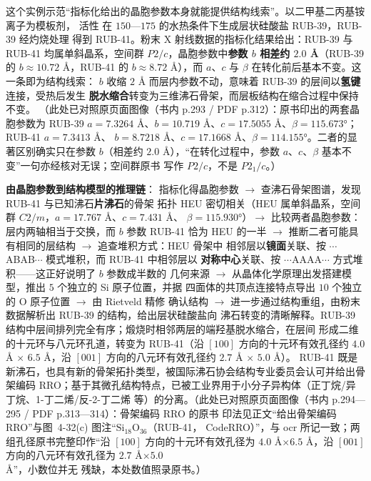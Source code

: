 \begin{principle}
这个实例示范``指标化给出的晶胞参数本身就能提供结构线索''。以二甲基二丙基铵离子为模板剂，
活性  在 $150$—$175$ \degC{} 的水热条件下生成层状硅酸盐 RUB-39，RUB-39 经灼烧处理
得到 RUB-41。粉末 X 射线数据的指标化结果给出：RUB-39 与 RUB-41 均属单斜晶系，空间群
$P2/c$，晶胞参数中\textbf{参数 $b$ 相差约 $2.0$ Å}（RUB-39 的 $b\approx10.72$ Å，RUB-41 的
$b\approx8.72$ Å），而 $a$、$c$ 与 $\beta$ 在转化前后基本不变。这一条即为结构线索：
$b$ 收缩 $2$ Å 而层内参数不动，意味着 RUB-39 的层间以\textbf{氢键}连接，受热后发生
\textbf{脱水缩合}转变为三维沸石骨架，而层板结构在缩合过程中保持不变。
（此处已对照原页面图像（书内 p.293 / PDF p.312）：原书印出的两套晶胞参数为 RUB-39
$a=7.3264$ Å、$b=10.719$ Å、$c=17.5055$ Å、$\beta=115.673°$；RUB-41 $a=7.3413$ Å、
$b=8.7218$ Å、$c=17.1668$ Å、$\beta=114.155°$。二者的显著区别确实只在参数 $b$（相差约
$2.0$ Å），``在转化过程中，参数 $a$、$c$、$\beta$ 基本不变''一句亦经核对无误；空间群原书
写作 $P2/c$，不是 $P2_{1}/c$。）
\end{principle}

\begin{dataflow}
\textbf{由晶胞参数到结构模型的推理链}：
指标化得晶胞参数 $\rightarrow$ 查沸石骨架图谱，发现 RUB-41 与已知沸石\textbf{片沸石}的骨架
拓扑 HEU 密切相关（HEU 属单斜晶系，空间群 $C2/m$，$a=17.767$ Å、$c=7.431$ Å、
$\beta=115.930°$）$\rightarrow$ 比较两者晶胞参数：层内两轴相当于交换，而 $b$ 参数 RUB-41 恰为
HEU 的一半 $\rightarrow$ 推断二者可能具有相同的层结构 $\rightarrow$ 追查堆积方式：HEU 骨架中
相邻层以\textbf{镜面}关联、按 $\cdots$ABAB$\cdots$ 模式堆积，而 RUB-41 中相邻层以
\textbf{对称中心}关联、按 $\cdots$AAAA$\cdots$ 方式堆积——这正好说明了 $b$ 参数成半数的
几何来源 $\rightarrow$ 从晶体化学原理出发搭建模型，推出 $5$ 个独立的 Si 原子位置，并据
 四面体的共顶点连接特点导出 $10$ 个独立的 O 原子位置 $\rightarrow$ 由 Rietveld 精修
确认结构 $\rightarrow$ 进一步通过结构重组，由粉末数据解析出 RUB-39 的结构，给出层状硅酸盐向
沸石转变的清晰解释。RUB-39 结构中层间排列完全有序；煅烧时相邻两层的端羟基脱水缩合，在层间
形成二维的十元环与八元环孔道，转变为 RUB-41（沿 $[100]$ 方向的十元环有效孔径约
$4.0$ Å $\times$ $6.5$ Å，沿 $[001]$ 方向的八元环有效孔径约 $2.7$ Å $\times$ $5.0$ Å）。
RUB-41 既是新沸石，也具有新的骨架拓扑类型，被国际沸石协会结构专业委员会认可并给出骨架编码
RRO；基于其微孔结构特点，已被工业界用于小分子异构体（正丁烷/异丁烷、1-丁二烯/反-2-丁二烯
等）的分离。（此处已对照原页面图像（书内 p.294—295 / PDF p.313—314）：骨架编码 RRO 的原书
印法见正文``给出骨架编码 RRO''与图~4-32(c) 图注``$\mathrm{Si}_{18}\mathrm{O}_{36}$（RUB-41，
CodeRRO）''，与 ocr 所记一致；两组孔径原书完整印作``沿 $[100]$ 方向的十元环有效孔径为
$4.0$ Å$\times6.5$ Å，沿 $[001]$ 方向的八元环有效孔径为 $2.7$ Å$\times5.0$ Å''，小数位并无
残缺，本处数值照录原书。）
\end{dataflow}

